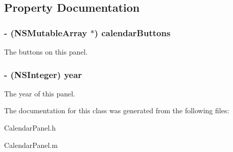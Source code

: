 \subsection{\-Property \-Documentation}
\hypertarget{interface_calendar_panel_a16ee2521285d33fe0fb8e01bc4158af0}{
\subsubsection[{calendar\-Buttons}]{\setlength{\rightskip}{0pt plus 5cm}-\/ (\-N\-S\-Mutable\-Array $\ast$) {\bf calendar\-Buttons}}}\label{interface_calendar_panel_a16ee2521285d33fe0fb8e01bc4158af0}
\-The buttons on this panel. \hypertarget{interface_calendar_panel_a295b0edcda13b30bc67c263a39dbb58a}{
\subsubsection[{year}]{\setlength{\rightskip}{0pt plus 5cm}-\/ (\-N\-S\-Integer) {\bf year}}}\label{interface_calendar_panel_a295b0edcda13b30bc67c263a39dbb58a}
\-The year of this panel. 

\-The documentation for this class was generated from the following files\-:\begin{DoxyCompactItemize}
\item 
\-Calendar\-Panel.\-h\item 
\-Calendar\-Panel.\-m\end{DoxyCompactItemize}

